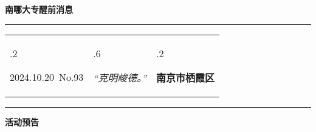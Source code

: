 \documentclass[letterpaper, 12pt]{article}
\begin{document}
\begin{center}
    \Huge\textbf{南哪大专醒前消息}
\end{center}
\vspace{4mm}
\hrule
\renewcommand\tabularxcolumn[1]{m{#1}}
\begin{tabularx}{\textwidth}{>{\hsize.2\hsize}X>{\hsize.6\hsize}X>{\hsize.2\hsize}X}
    \begin{flushleft}
        2024.10.20\, No.93
    \end{flushleft}
    &
    \begin{center}
        \textit{“克明峻德。”}
    \end{center}
    &
    \begin{flushright}
        \textbf{南京市栖霞区}
    \end{flushright}
\end{tabularx}
\vspace{-3.5mm}
\hrule
\vspace{4mm}
\centerline{\huge\textbf{活动预告}}
\end{document}
